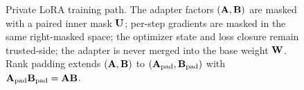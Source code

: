 \begin{figure}[h]
\caption{Private LoRA training path. The adapter factors $(\mathbf{A}, \mathbf{B})$ are masked with a paired inner mask $\mathbf{U}$; per-step gradients are masked in the same right-masked space; the optimizer state and loss closure remain trusted-side; the adapter is never merged into the base weight $\mathbf{W}$. Rank padding extends $(\mathbf{A}, \mathbf{B})$ to $(\mathbf{A}_{\mathrm{pad}}, \mathbf{B}_{\mathrm{pad}})$ with $\mathbf{A}_{\mathrm{pad}}\mathbf{B}_{\mathrm{pad}} = \mathbf{A}\mathbf{B}$.}
\label{fig:lora-training}
\end{figure}
